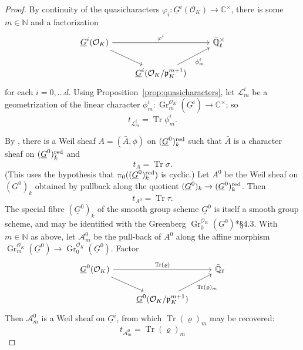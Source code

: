 \documentclass[10pt]{amsart}
\theoremstyle{plain}
\theoremstyle{definition}
\newcommand{\NN}{{\mathbb{N}}}
\newcommand{\CC}{{\mathbb{C}}}
\newcommand{\EE}{\mathbb{\bar Q}_\ell}
\newcommand{\OK}{\mathcal{O}_K}
\newcommand{\bFq}{\bar{k}}
\newcommand{\Fq}{k}
\newcommand{\EEx}{\EE^\times}
\DeclareMathOperator{\Gr}{Gr}
\DeclareMathOperator{\trace}{Tr}
\newcommand{\trFrob}[1]{t_{#1}}
\newcommand{\cs}[1]{{\mathcal{#1}}}
\begin{document}
\begin{proof}

By continuity of the quasicharacters $\varphi_i : \underline{G}^i(\OK) \to \CC^\times$, there is some $m \in \NN$ and a factorization
\[
\begin{tikzcd}
\underline{G}^i(\OK) \arrow{rr}{\varphi^i} \arrow{rd} && \EEx\\
& \underline{G}^i(\OK/\mathfrak{p}_K^{m+1}) \arrow{ru}[swap]{\phi^i_m} 
\end{tikzcd}
\] 
for each $i=0, \ldots d$.
Using Proposition~\ref{prop:quasicharacters}, let $\cs{L}^i_m$ be a geometrization of the linear character $\phi^i_m: \Gr^{\OK}_{m}(\underline{G}^i) \to \CC^\times$; so
\[
\trFrob{\cs{L}^i_m} = \trace \phi^i_m.
\]

By \cite{lusztig:CSDG}, there is a Weil sheaf $A = ({\bar A},\phi)$ on $(\underline{G}^0)_\Fq^\reductive$ such that ${\bar A}$ is a character sheaf on $(\underline{G}^0)_{\bFq}^\reductive$ and
\[
\trFrob{A} = \trace \sigma.
\]
(This uses the hypothesis that $\pi_0((\underline{G}^0)_\Fq^\reductive)$ is cyclic.)
Let $A^0$ be the Weil sheaf on $(\underline{G}^0)_\Fq$ obtained by pullback along the quotient $(\underline{G}^0)_\Fq \to (\underline{G}^0)_\Fq^\reductive$.
Then 
\[
\trFrob{A^0} = \trace \tau.
\]
The special fibre $(\underline{G}^0)_\Fq$ of the smooth group scheme $\underline{G}^0$ is itself a smooth group scheme, and may be identified with the Greenberg $\Gr^{\OK}_0(\underline{G}^0)$\cite{CR}*{\S 4.3}. 
With $m\in \NN$ as above, let $\cs{A}_m^0$ be the pull-back of $A^0$ along the affine morphism
$\Gr^{\OK}_{m}(\underline{G}^0) \to \Gr^{\OK}_{0}(\underline{G}^0)$.
Factor
\[
\begin{tikzcd}
\underline{G}^0(\OK) \arrow{rr}{\trace(\varrho)} \arrow{rd} && \EE \\
& \underline{G}^0(\OK/\mathfrak{p}_K^{m+1}) \arrow{ru}[swap]{\trace(\varrho)_m} 
\end{tikzcd}
\]
Then $\cs{A}_m^0$ is a Weil sheaf on $\underline{G}^i$, from which $\trace(\varrho)_m$ may be recovered:
\[
\trFrob{\cs{A}^0_m} = \trace(\varrho)_m
\]


\end{proof}
\end{document}
